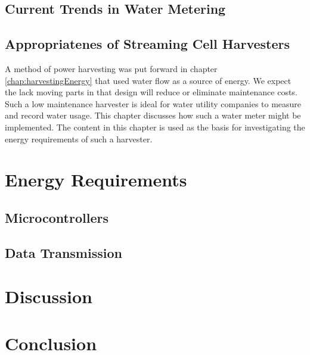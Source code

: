   \section{Current Trends in Water Metering}
  \section{Appropriatenes of Streaming Cell Harvesters}

  A method of power harvesting was put forward in chapter \ref{chap:harvestingEnergy} that used water flow as a source of energy.
  We expect the lack moving parts in that design will reduce or eliminate maintenance costs.
  Such a low maintenance harvester is ideal for water utility companies to measure and record water usage.
  This chapter discusses how such a water meter might be implemented.
  The content in this chapter is used as the basis for investigating the energy requirements of such a harvester.
  

\chapter{Energy Requirements}
  \label{chap:energyRequirements}
  
  \section{Microcontrollers}
      
  
  \section{Data Transmission}
      

\chapter{Discussion}

\chapter{Conclusion}